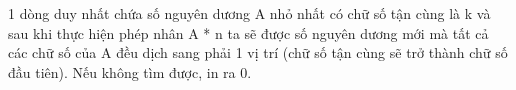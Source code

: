 1 dòng duy nhất chứa số nguyên dương A nhỏ nhất có chữ số tận cùng là k và sau khi thực hiện phép nhân A * n ta sẽ được số nguyên dương mới mà tất cả các chữ số của A đều dịch sang phải 1 vị trí (chữ số tận cùng sẽ trở thành chữ số đầu tiên). Nếu không tìm được, in ra 0.